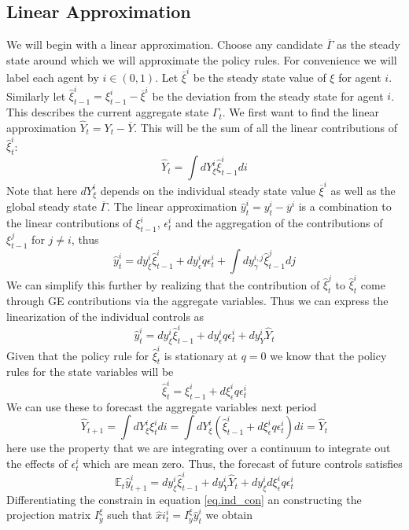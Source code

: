 \documentclass[thmsb,11pt]{article}
\newcommand{\EE}{\mathbb E}
\begin{document}
\subsection{Linear Approximation}
We will begin with a linear approximation.  Choose any candidate $\overline \Gamma$ as the steady state around which we will approximate the policy rules.  For convenience we will label each agent by $i\in(0,1)$.  Let $\overline \xi^i$ be the steady state value of $\xi$ for agent $i$.  Similarly let $\hat \xi^i_{t-1}  = \xi^i_{t-1} - \overline\xi^i$ be the deviation from the steady state for agent $i$.  This describes the current aggregate state $\Gamma_t$.  We first want to find the linear approximation $\hat Y_t = Y_t - \overline Y$.  This will be the sum of all the linear contributions of $\hat \xi^i_t$:
\begin{equation}\label{eq.Yhat}
	\hat Y_t = \int dY^i_{\xi} \hat \xi^i_{t-1} di
\end{equation}  Note that here $dY^i_\xi$ depends on the individual steady state value $\overline \xi^i$ as well as the global steady state $\overline \Gamma$.  The linear approximation  $\hat y^i_t = y^i_t -\overline y^i$ is a combination to the linear contributions of $\xi^i_{t-1}$, $\epsilon^i_t$ and the aggregation of the contributions of $\xi^j_{t-1}$ for $j\neq i$, thus
\[
	\hat y^i_t = dy^i_\xi \hat\xi^i_{t-1} +  dy^i_\epsilon q\epsilon^i_t + \int dy^{i,j}_\gamma \hat \xi^j_{t-1} dj
\]  We can simplify this further by realizing that the contribution of $\hat \xi^j_t$ to $\hat \xi^i_t$ come through GE contributions via the aggregate variables.  Thus we can express the linearization of the individual controls as 
\begin{equation}\label{eq.y_hat}
	\hat y^i_t =  dy^i_\xi \hat\xi^i_{t-1} +  dy^i_\epsilon q\epsilon^i_t + dy^i_Y \hat Y_t
\end{equation}  Given that the policy rule for $\hat \xi^i_t$ is stationary at $q=0$ we know that the policy rules for the state variables will be 
\[
	\hat \xi^i_t = \xi^i_{t-1} + d\xi^i_\epsilon q\epsilon^i_t
\]  We can use these to forecast the aggregate variables next period
\[
	\hat Y_{t+1} = \int dY^i_\xi \xi^i_{t} di= \int dY^i_\xi(\hat \xi^i_{t-1}  + d\xi^i_\epsilon q\epsilon^i_t)di = \hat Y_t
\]here use the property that we are integrating over a continuum to integrate out the effects of $\epsilon^i_t$ which are mean zero.  Thus, the forecast of future controls satisfies
\[
	\EE_t \hat y^i_{t+1} = dy^i_\xi \hat\xi^i_{t-1}  + dy^i_Y \hat Y_t + dy^i_\xi d\xi^i_\epsilon q\epsilon^i_t	
\]Differentiating the constrain in equation \eqref{eq.ind_con} an constructing the projection matrix $I^\xi_y$ such that $\hat xi^i_t = I^\xi_y \hat y^i_t$ we obtain
\end{document}
